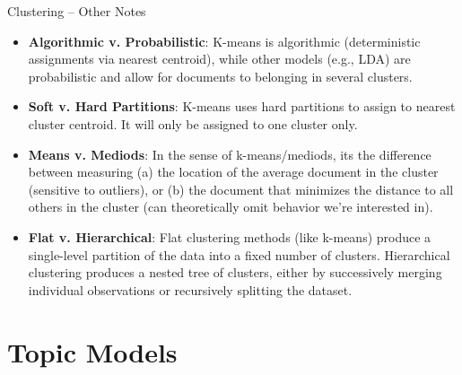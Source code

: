 \documentclass[
  ignorenonframetext,
  aspectratio=169]{beamer}
\begin{document}
\begin{frame}{Clustering -- Other Notes}
\label{clustering-other-notes}
\begin{itemize}
\item \textbf{Algorithmic v. Probabilistic}: K-means is algorithmic (deterministic assignments via nearest centroid), while other models (e.g., LDA) are probabilistic and allow for documents to belonging in several clusters. \par \vspace{2.5mm} \pause
\item \textbf{Soft v. Hard Partitions}: K-means uses hard partitions to assign to nearest cluster centroid. It will only be assigned to one cluster only. \par \vspace{2.5mm} \pause
\item \textbf{Means v. Mediods}:  In the sense of k-means/mediods, its the difference between measuring (a) the location of the average document in the cluster (sensitive to outliers), or (b) the document that minimizes the distance to all others in the cluster (can theoretically omit behavior we're interested in). \par \vspace{2.5mm} \pause
\item \textbf{Flat v. Hierarchical}: Flat clustering methods (like k-means) produce a single-level partition of the data into a fixed number of clusters. Hierarchical clustering produces a nested tree of clusters, either by successively merging individual observations or recursively splitting the dataset.
\end{itemize}
\end{frame}

\section{Topic Models}\label{topic-models}
\end{document}
